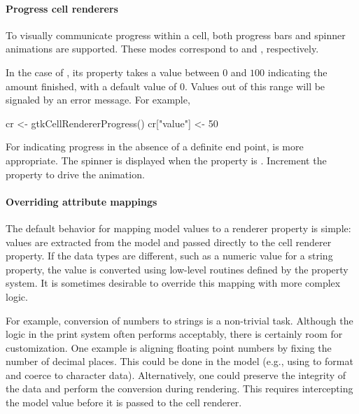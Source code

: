 \paragraph{Progress cell renderers}

To visually communicate progress within a cell, both progress bars and
spinner animations are supported. These modes correspond to
 and ,
respectively.

In the case of , its 
property takes a value between $0$ and $100$ indicating the amount
finished, with a default value of $0$. Values out of this range will
be signaled by an error message.  For example,
\begin{Schunk}
\begin{Sinput}
 cr <- gtkCellRendererProgress()
 cr["value"] <- 50
\end{Sinput}
\end{Schunk}

For indicating progress in the absence of a definite end point,
 is more appropriate. The spinner is
displayed when the  property is . Increment
the  property to drive the animation.

\paragraph{Overriding attribute mappings}

The default behavior for mapping model values to a renderer property
is simple: values are extracted from the model and passed directly to
the cell renderer property. If the data types are different, such as a
numeric value for a string property, the value is converted using
low-level routines defined by the property system. It is sometimes
desirable to override this mapping with more complex logic.

For example, conversion of numbers to strings is a non-trivial
task. Although the logic in the \R\/ print system often performs
acceptably, there is certainly room for customization. One example is
aligning floating point numbers by fixing the number of decimal
places. This could be done in the model (e.g., using
 to format and coerce to character
data). Alternatively, one could preserve the integrity of the data and
perform the conversion during rendering. This requires intercepting
the model value before it is passed to the cell renderer. 

